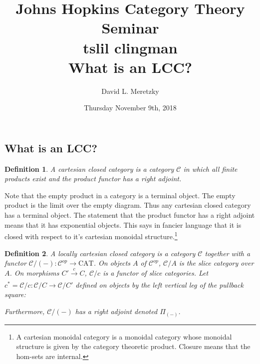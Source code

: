 \documentclass{article}
\title{ \vspace{-10ex} %
Johns Hopkins Category Theory Seminar\\ 
tslil clingman\\ 
What is an LCC?
}
\author{David L. Meretzky
}
\date{%
Thursday November 9th, 2018
}
\theoremstyle{problemstyle}
\theoremstyle{problemstyle}
\newtheorem{definition}{Definition}
\theoremstyle{problemstyle}
\theoremstyle{problemstyle}
\theoremstyle{problemstyle}
\theoremstyle{problemstyle}
\theoremstyle{problemstyle}
\theoremstyle{problemstyle}
\begin{document}
\maketitle


\subsection{What is an LCC?}

\begin{definition}
A cartesian closed category is a category $\mathcal{C}$ in which all finite products exist and the product functor has a right adjoint. 
\end{definition}

Note that the empty product in a category is a terminal object. The empty product is the limit over the empty diagram. Thus any cartesian closed category has a terminal object. The statement that the product functor has a right adjoint means that it has exponential objects. This says in fancier language that it is closed with respect to it's cartesian monoidal structure.\footnote{A cartesian monoidal category is a monoidal category whose monoidal structure is given by the category theoretic product. Closure means that the hom-sets are internal.}\\




\begin{definition}
A locally cartesian closed category is a category $\mathcal{C}$ together with a functor $\mathcal{C}/(-):\mathcal{C}^{op} \rightarrow \text{CAT}$.
On objects $A$ of $\mathcal{C}^{op}$, $\mathcal{C}/A$ is the slice category over $A$. On morphisms $C' \xrightarrow[]{c} C$, $\mathcal{C}/c$ is a functor of slice categories. Let $c^* = \mathcal{C}/c:\mathcal{C}/C \rightarrow \mathcal{C}/C'$ defined on objects by the left vertical leg of the pullback square: 

\begin{center}
\end{center}

Furthermore, $\mathcal{C}/(-)$ has a right adjoint denoted $\Pi_{(-)}$. 
\end{definition}
\end{document}
